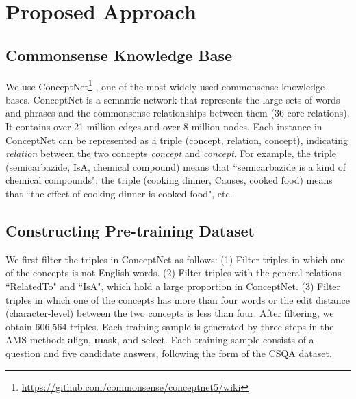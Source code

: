 \documentclass[11pt,a4paper]{article}
\begin{document}
\section{Proposed Approach}
\subsection{Commonsense Knowledge Base}
\label{sect:kb}
We use ConceptNet\footnote{\url{https://github.com/commonsense/conceptnet5/wiki}} \citep{speer2017conceptnet}, one of the most widely used commonsense knowledge bases.
ConceptNet is a semantic network that represents the large sets of words and phrases and the commonsense relationships between them (36 core relations).
It contains over 21 million edges and over 8 million nodes.
Each instance in ConceptNet can be represented as a triple 
(concept, relation, concept), indicating \textit{relation} between the two concepts \textit{concept} and \textit{concept}. 
For example, the triple (semicarbazide, IsA, chemical compound) means that ``semicarbazide is a kind of chemical compounds"; the triple (cooking dinner, Causes, cooked food) means that ``the effect of cooking dinner is cooked food", etc.

\subsection{Constructing Pre-training Dataset}
\label{sect:dataset}
We first filter the triples in ConceptNet as follows:
(1) Filter triples in which one of the concepts is not English words.
(2) Filter triples with the general relations ``RelatedTo" and ``IsA", which hold a large proportion in ConceptNet.
(3) Filter triples in which one of the concepts has more than four words or the edit distance (character-level) between the two concepts is less than four.
After filtering, we obtain 606,564 triples.
Each training sample is generated by three steps in the AMS method: \textbf{a}lign, \textbf{m}ask, and \textbf{s}elect.
Each training sample consists of a question and five candidate answers, following the form of the CSQA dataset. 
\end{document}
